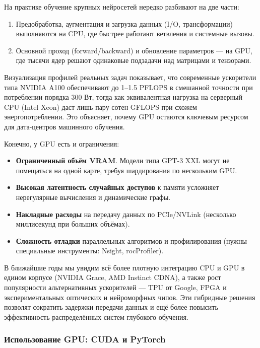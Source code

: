 На практике обучение крупных нейросетей нередко разбивают на две части:  
\begin{enumerate}  
  \item Предобработка, аугментация и загрузка данных (I/O, трансформации) выполняются на CPU, где быстрее работают ветвления и системные вызовы.  
  \item Основной проход (forward/backward) и обновление параметров — на GPU, где тысячи ядер решают одинаковые подзадачи над матрицами и тензорами.  
\end{enumerate}  

Визуализация профилей реальных задач показывает, что современные ускорители типа NVIDIA A100 обеспечивают до 1–1.5 PFLOPS в смешанной точности при потреблении порядка 300 Вт, тогда как эквивалентная нагрузка на серверный CPU (Intel Xeon) даст лишь пару сотен GFLOPS при схожем энергопотреблении. Это объясняет, почему GPU остаются ключевым ресурсом для дата-центров машинного обучения.  

Конечно, у GPU есть и ограничения:  
\begin{itemize}  
  \item \textbf{Ограниченный объём VRAM}. Модели типа GPT-3 XXL могут не помещаться на одной карте, требуя шардирования по нескольким GPU.  
  \item \textbf{Высокая латентность случайных доступов} к памяти усложняет нерегулярные вычисления и динамические графы.  
  \item \textbf{Накладные расходы} на передачу данных по PCIe/NVLink (несколько миллисекунд при больших объёмах).  
  \item \textbf{Сложность отладки} параллельных алгоритмов и профилирования (нужны специальные инструменты: Nsight, rocProfiler).  
\end{itemize}  

В ближайшие годы мы увидим всё более плотную интеграцию CPU и GPU в едином корпусе (NVIDIA Grace, AMD Instinct CDNA), а также рост популярности альтернативных ускорителей — TPU от Google, FPGA и экспериментальных оптических и нейроморфных чипов. Эти гибридные решения позволят сократить задержки передачи данных и ещё более повысить эффективность распределённых систем глубокого обучения.  


\subsubsection{Использование GPU: CUDA и PyTorch}
\label{sec:tools_gpu}

